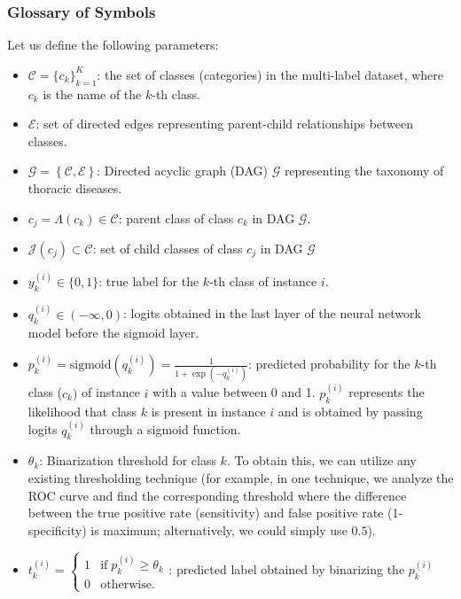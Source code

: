 \subsubsection{Glossary of Symbols}\label{subsubsec:notations}
Let us define the following parameters:
\begin{itemize}
    \item  $\mathcal{C} = {\{c_k\}}_{k=1}^{K}  $: the set of classes (categories) in the multi-label dataset, where $c_k $ is the name of the $k $-th class.
    \item  $\mathcal{E} $: set of directed edges representing parent-child relationships between classes.
    \item  $\mathcal{G}=\left\{\mathcal{C},\mathcal{E}\right\} $: Directed acyclic graph (DAG) $\mathcal{G} $ representing the taxonomy of thoracic diseases.
    \item  $c_j=\Lambda (c_k) \in \mathcal{C}$: parent class of class $c_k $ in DAG $\mathcal{G} $.
    \item  $\mathcal{J}(c_j) \subset \mathcal{C}$: set of child classes of class $c_j$ in DAG $\mathcal{G} $
    \item  $y_k^{(i)} \in \{0,1\} $: true label for the $k $-th class of instance $i $.
    \item  $q_k^{(i)} \in \left( -\infty,0 \right) $: logits obtained in the last layer of the neural network model before the sigmoid layer.
    \item  $p_k^{(i)} = \text{sigmoid}\left(q_k^{(i)}\right) = \frac{1}{1+\exp{\left(-q_k^{(i)}\right)}} $: predicted probability for the $k $-th class ($c_k) $ of instance $i $ with a value between 0 and 1. $p_k^{(i)} $ represents the likelihood that class $k $ is present in instance $i $ and is obtained by passing logits $q_k^{(i)} $ through a sigmoid function.
    \item  $\theta_k $: Binarization threshold for class $k $.  To obtain this, we can utilize any existing thresholding technique (for example, in one technique, we analyze the ROC curve and find the corresponding threshold where the difference between the true positive rate (sensitivity) and false positive rate (1-specificity) is maximum; alternatively, we could simply use $0.5 $).
    \item  $t_k^{(i)}=\left\{\begin{array}{lc}1&\text{if}\;p_k^{(i)} \geq \theta_k\\0&\text{otherwise.}\end{array}\right. $: predicted label obtained by binarizing the $p_k^{(i)} $

\end{itemize}
